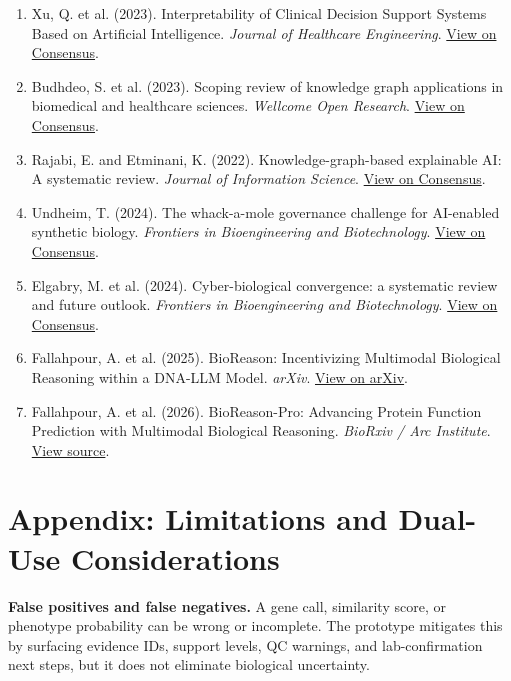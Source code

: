 \documentclass[11pt, letterpaper]{article}
\begin{document}
\begin{enumerate}[leftmargin=*]
    \item \label{xu2023} Xu, Q. et al. (2023). Interpretability of Clinical Decision Support Systems Based on Artificial Intelligence. \textit{Journal of Healthcare Engineering}. \href{https://consensus.app/papers/details/c3536b48507e527aa7049dddaa55ef84/?utm_source=unknown}{View on Consensus}.
    \item \label{budhdeo2023} Budhdeo, S. et al. (2023). Scoping review of knowledge graph applications in biomedical and healthcare sciences. \textit{Wellcome Open Research}. \href{https://consensus.app/papers/details/9c5d9984fda35ff3a299fa0a726f1607/?utm_source=unknown}{View on Consensus}.
    \item \label{rajabi2022} Rajabi, E. and Etminani, K. (2022). Knowledge-graph-based explainable AI: A systematic review. \textit{Journal of Information Science}. \href{https://consensus.app/papers/details/affdd66df0055d2596d7f155c3857fc4/?utm_source=unknown}{View on Consensus}.
    \item \label{undheim2024} Undheim, T. (2024). The whack-a-mole governance challenge for AI-enabled synthetic biology. \textit{Frontiers in Bioengineering and Biotechnology}. \href{https://consensus.app/papers/details/d13cdf4c37085be28493ea131ec8a1ca/?utm_source=unknown}{View on Consensus}.
    \item \label{elgabry2024} Elgabry, M. et al. (2024). Cyber-biological convergence: a systematic review and future outlook. \textit{Frontiers in Bioengineering and Biotechnology}. \href{https://consensus.app/papers/details/f773095e6925525a83eddd97ecb678de/?utm_source=unknown}{View on Consensus}.
    \item \label{fallahpour2025} Fallahpour, A. et al. (2025). BioReason: Incentivizing Multimodal Biological Reasoning within a DNA-LLM Model. \textit{arXiv}. \href{https://arxiv.org/abs/2505.23579}{View on arXiv}.
    \item \label{fallahpour2026} Fallahpour, A. et al. (2026). BioReason-Pro: Advancing Protein Function Prediction with Multimodal Biological Reasoning. \textit{BioRxiv / Arc Institute}. \href{https://arcinstitute.org/news/bioreason-pro}{View source}.
\end{enumerate}

\section*{Appendix: Limitations and Dual-Use Considerations}

\textbf{False positives and false negatives.} A gene call, similarity score, or phenotype probability can be wrong or incomplete. The prototype mitigates this by surfacing evidence IDs, support levels, QC warnings, and lab-confirmation next steps, but it does not eliminate biological uncertainty.
\end{document}
